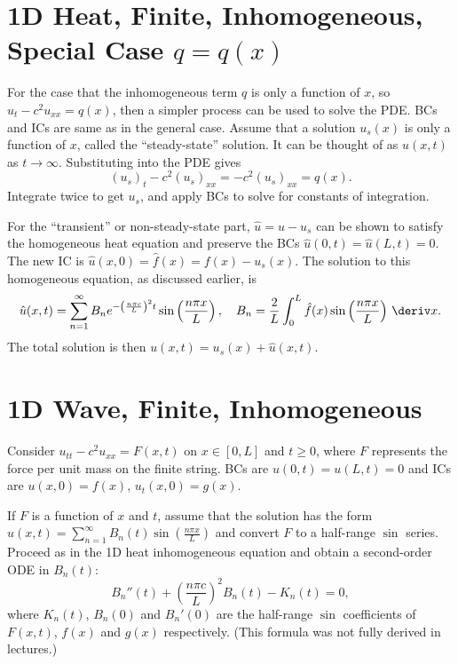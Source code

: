 \documentclass[10pt, a4paper]{article}
\begin{document}
\begin{landscape}
\begin{multicols*}{2}
\end{multicols*}

\pagebreak

\begin{multicols*}{2}

    \section{1D Heat, Finite, Inhomogeneous, Special Case \texorpdfstring{\(q = q(x)\)}{q = q(x)}}

    For the case that the inhomogeneous term \(q\) is only a function of \(x\), so \(u_{t} - c^{2} u_{xx} = q(x)\),
    then a simpler process can be used to solve the PDE. BCs and ICs are same as in the general case.
    Assume that a solution \(u_{s}(x)\) is only a function of \(x\),
    called the ``steady-state'' solution. It can be thought of as \(u(x, t)\) as \(t \to \infty\). Substituting into the
    PDE gives
    \[
        (u_{s})_t - c^{2} (u_{s})_{xx} = -c^{2} (u_{s})_{xx} = q(x).
    \]
    Integrate twice to get \(u_{s}\), and apply BCs to solve for constants of integration.

    For the ``transient'' or non-steady-state part, \(\hat u = u - u_s\) can be shown to satisfy the
    homogeneous heat equation and preserve the BCs \(\hat u(0, t) = \hat u(L, t) = 0\).
    The new IC is \(\hat u(x, 0) = \hat f(x) = f(x) - u_s(x)\). The solution to this homogeneous equation,
    as discussed earlier, is
    \[
        \hat u(x, t) 
        = \sum_{n=1}^{\infty} B_n 
            e^{-\left(\frac{n \pi c}{L}\right)^2 t}
            \sin \left(\frac{n \pi x}{L}\right),
        \quad
        B_n = \frac{2}{L} \int_0^L \hat f(x) \sin \left(\frac{n \pi x}{L}\right) \,\deriv x.
    \]
    The total solution is then \(u(x, t) = u_s(x) + \hat u(x, t)\).

    \section{1D Wave, Finite, Inhomogeneous}

    Consider \(u_{tt} - c^2 u_{xx} = F(x, t)\) on \(x \in [0, L]\) and \(t \geq 0\), where \(F\) represents
    the force per unit mass on the finite string. BCs are \(u(0, t) = u(L, t) = 0\) and ICs are
    \(u(x, 0) = f(x)\), \(u_t(x, 0) = g(x)\).

    If \(F\) is a function of \(x\) and \(t\), assume that the solution has the form
    \(u(x, t) = \sum_{n=1}^{\infty} B_n(t) \sin\left(\frac{n \pi x}{L}\right)\) and convert \(F\) to a half-range
    \(\sin\) series. Proceed as in the 1D heat inhomogeneous equation and obtain a second-order ODE in \(B_n(t)\):
    \[
        B_n''(t) + \left(\frac{n \pi c}{L}\right)^2 B_n(t) - K_n(t) = 0,
    \]
    where \(K_n(t)\), \(B_n(0)\) and \(B_n'(0)\) are the half-range \(\sin\) coefficients of
    \(F(x, t)\), \(f(x)\) and \(g(x)\) respectively. (This formula was not fully derived in lectures.)
    

\end{multicols*}
\end{landscape}
\end{document}
